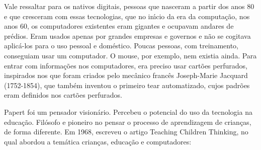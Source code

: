 \documentclass[
12pt,		%
openright,	%
twoside,  %
a4paper,			%
chapter=TITLE,		%
english,			%
french,				%
spanish,			%
brazil				%
]{USPSC-classe/USPSC}
\begin{document}
Vale ressaltar para os nativos digitais, pessoas que nasceram a partir dos anos 80 e que cresceram com essas tecnologias, que no in\'{\i}cio da era da computa\c{c}\~ao, nos anos 60, os computadores existentes eram gigantes e ocupavam andares de pr\'edios. Eram usados apenas por grandes empresas e governos e n\~ao se cogitava aplic\'a-los para o uso pessoal e dom\'estico. Poucas pessoas, com treinamento, conseguiam usar um computador. O mouse, por exemplo, nem existia ainda. Para entrar com informa\c{c}\~oes nos computadores, era preciso usar cart\~oes perfurados, inspirados nos que foram criados pelo mec\^anico franc\^es Joseph-Marie Jacquard (1752-1854), que tamb\'em inventou o primeiro tear automatizado, cujos padr\~oes eram definidos nos cart\~oes perfurados.

















Papert foi um pensador vision\'ario. Percebeu o potencial do uso da tecnologia na educa\c{c}\~ao. Fil\'osofo e pioneiro no pensar o processo de aprendizagem de crian\c{c}as, de forma diferente. Em 1968, escreveu o artigo \textquotedbl Teaching Children Thinking\textquotedbl , no qual abordou a tem\'atica crian\c{c}as, educa\c{c}\~ao e computadores:


















\noindent\begin{center}\mbox{\centering{}}\end{center}
\end{document}
